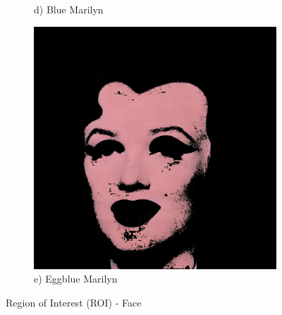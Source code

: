 \documentclass{article}
\begin{document}
\begin{figure}[htbp]
\begin{subfigure}[b]{0.19\textwidth}
        \caption*{d) Blue Marilyn}
    \end{subfigure}
    \hfill
    \begin{subfigure}[b]{0.19\textwidth}
        \includegraphics[width=\textwidth]{main_files/figure-latex/12_4_eggblue_marilyn_face_extraction.jpg}
        \caption*{e) Eggblue Marilyn}
    \end{subfigure}
    
    \caption{Region of Interest (ROI) - Face}
\end{figure}
\end{document}
